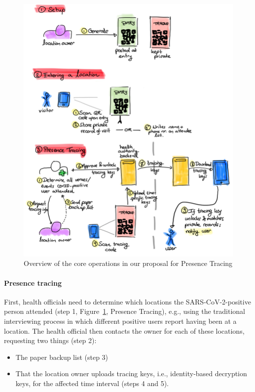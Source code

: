 \begin{figure}
  \includegraphics[width=\textwidth]{figures/overview2}
  \caption{\label{fig:overview}Overview of the core operations in our proposal for Presence Tracing}
\end{figure}

\paragraph{Presence tracing}
First, health officials need to determine which locations the SARS-CoV-2-positive person attended (step 1, Figure~\ref{fig:overview}, Presence Tracing), e.g., using the traditional interviewing process in which different positive users report having been at a location. The health official then contacts the owner for each of these locations, requesting two things (step 2):

\begin{itemize}[topsep=0pt, partopsep=0pt]
\item The paper backup list (step 3)
\item That the location owner uploads tracing keys, i.e., identity-based decryption keys, for the affected time interval (steps 4 and 5).
\end{itemize}

